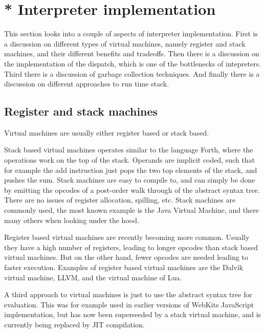\section{* Interpreter implementation}
\label{interpreter-implementation}
This section looks into a couple of aspects of interpreter implementation.
First is a discussion on different types of virtual machines, namely register and stack machines, and their different benefits and tradeoffs.
Then there is a discussion on the implementation of the dispatch, which is one of the bottlenecks of intepreters.
Third there is a discussion of garbage collection techniques.
And finally there is a discussion on different approaches to run time stack.

\subsection{Register and stack machines}
Virtual machines are usually either register based or stack based.

Stack based virtual machines operates similar to the language Forth, where the operations work on the top of the stack. 
Operands are implicit coded, such that for example the add instruction just pops the two top elements of the stack, and pushes the sum. 
Stack machines are easy to compile to, 
and can simply be done by emitting the opcodes of a post-order walk through of the abstract syntax tree. 
There are no issues of register allocation, spilling, etc.
Stack machines are commonly used, the most known example is the Java Virtual Machine, and there many others when looking under the hood.

Register based virtual machines are recently becoming more common. 
Usually they have a high number of registers, leading to longer opcodes than stack based virtual machines. But on the other hand, fewer opcodes are needed leading to faster execution\cite{register-vs-stack}. 
Examples of register based virtual machines are the Dalvik\cite{dalvik} virtual machine, LLVM\cite{llvm}, and the virtual machine of Lua\cite{luavm}.

A third approach to virtual machines is just to use the abstract syntax tree for evaluation. This was for example used in earlier versions of WebKits JavaScript implementation, but has now been superseeded by a stack virtual machine, and is currently being replaced by JIT compilation.

